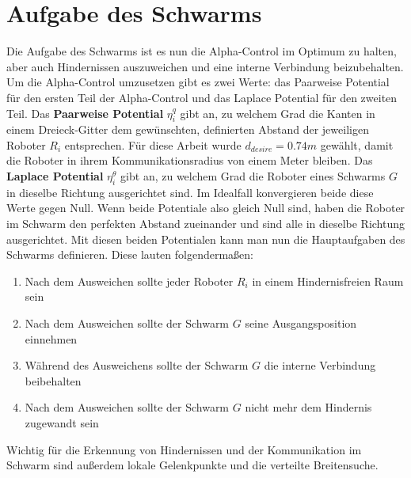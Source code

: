 \section{Aufgabe des Schwarms}

Die Aufgabe des Schwarms ist es nun die Alpha-Control im Optimum zu halten, aber auch 
Hindernissen auszuweichen und eine interne Verbindung beizubehalten. Um die Alpha-Control umzusetzen 
gibt es zwei Werte: das Paarweise Potential für den ersten Teil der Alpha-Control und das Laplace 
Potential für den zweiten Teil. Das \textbf{Paarweise Potential} $\eta_i^q$ gibt an, zu welchem Grad die Kanten 
in einem Dreieck-Gitter dem gewünschten, definierten Abstand der jeweiligen Roboter $R_i$ entsprechen. 
Für diese Arbeit wurde $d_{desire}=0.74m$ gewählt, damit die Roboter in ihrem Kommunikationsradius 
von einem Meter bleiben. Das \textbf{Laplace Potential} $\eta_i^\theta$ gibt an, zu welchem Grad die Roboter 
eines Schwarms $G$ in dieselbe Richtung ausgerichtet sind. Im Idealfall konvergieren beide diese Werte 
gegen Null. Wenn beide Potentiale also gleich Null sind,
haben die Roboter im Schwarm den perfekten Abstand zueinander und sind alle in dieselbe Richtung
ausgerichtet. Mit diesen beiden Potentialen kann man nun die Hauptaufgaben des Schwarms 
definieren. Diese lauten folgendermaßen:

\begin{enumerate}
    \item Nach dem Ausweichen sollte jeder Roboter $R_i$ in einem Hindernisfreien Raum sein
    \item Nach dem Ausweichen sollte der Schwarm $G$ seine Ausgangsposition einnehmen
    \item Während des Ausweichens sollte der Schwarm $G$ die interne Verbindung beibehalten
    \item Nach dem Ausweichen sollte der Schwarm $G$ nicht mehr dem Hindernis zugewandt sein
\end{enumerate}

Wichtig für die Erkennung von Hindernissen und der Kommunikation im Schwarm sind außerdem lokale 
Gelenkpunkte und die verteilte Breitensuche.